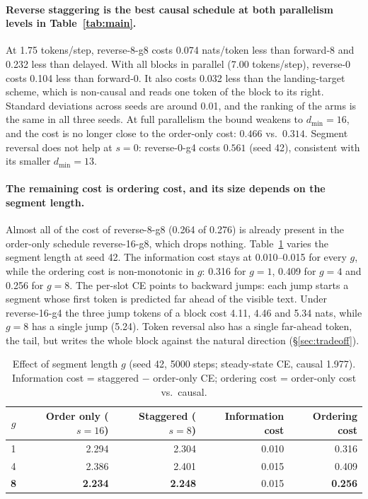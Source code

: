 \documentclass[11pt]{article}
\theoremstyle{definition}
\theoremstyle{remark}
\newcommand{\sch}[1]{\textsf{#1}}
\newcommand{\dmin}{d_{\min}}
\begin{document}
\paragraph{Reverse staggering is the best causal schedule at both parallelism levels in Table~\ref{tab:main}.}
At 1.75 tokens/step, \sch{reverse-8-g8} costs 0.074 nats/token less than \sch{forward-8} and 0.232 less than \sch{delayed}.
With all blocks in parallel (7.00 tokens/step), \sch{reverse-0} costs 0.104 less than \sch{forward-0}.
It also costs 0.032 less than the landing-target scheme, which is non-causal and reads one token of the block to its right.
Standard deviations across seeds are around 0.01, and the ranking of the arms is the same in all three seeds.
At full parallelism the bound weakens to $\dmin=16$, and the cost is no longer close to the order-only cost: $0.466$ vs.\ $0.314$.
Segment reversal does not help at $s=0$: \sch{reverse-0-g4} costs $0.561$ (seed 42), consistent with its smaller $\dmin=13$.

\paragraph{The remaining cost is ordering cost, and its size depends on the segment length.}
Almost all of the cost of \sch{reverse-8-g8} (0.264 of 0.276) is already present in the order-only schedule \sch{reverse-16-g8}, which drops nothing.
Table~\ref{tab:segment} varies the segment length at seed 42.
The information cost stays at 0.010--0.015 for every $g$, while the ordering cost is non-monotonic in $g$: 0.316 for $g=1$, 0.409 for $g=4$ and 0.256 for $g=8$.
The per-slot CE points to backward jumps: each jump starts a segment whose first token is predicted far ahead of the visible text.
Under \sch{reverse-16-g4} the three jump tokens of a block cost 4.11, 4.46 and 5.34 nats, while $g=8$ has a single jump (5.24).
Token reversal also has a single far-ahead token, the tail, but writes the whole block against the natural direction (\S\ref{sec:tradeoff}).

\begin{table}[t]
  \centering
  \caption{Effect of segment length $g$ (seed 42, 5000 steps; steady-state CE, causal 1.977). Information cost = staggered $-$ order-only CE; ordering cost = order-only cost vs.\ causal.}
  \label{tab:segment}
  \small
  \begin{tabular}{crrrr}
    \toprule
    $g$ & Order only ($s=16$) & Staggered ($s=8$) & Information cost & Ordering cost \\
    \midrule
    1 & 2.294 & 2.304 & 0.010 & 0.316 \\
    4 & 2.386 & 2.401 & 0.015 & 0.409 \\
    \textbf{8} & \textbf{2.234} & \textbf{2.248} & 0.015 & \textbf{0.256} \\
    \bottomrule
  \end{tabular}
\end{table}
\end{document}
